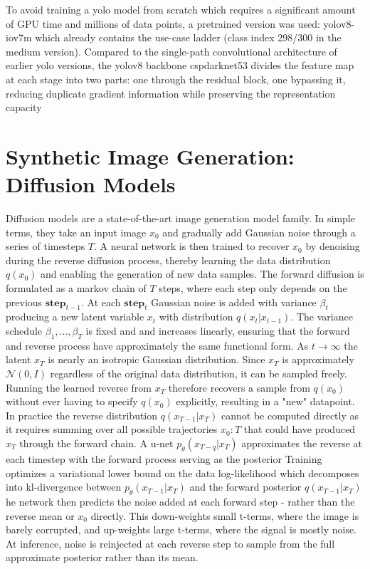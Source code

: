 To avoid training a \gls{yolo} model from scratch which requires a significant amount of GPU time and millions of data points, a pretrained version was used: \gls{yolov8-iov7m} 
which already contains the use-case ladder (class index 298/300 in the medium version).
Compared to the single-path convolutional architecture of earlier \gls{yolo} versions, the \gls{yolo}v8 backbone \gls{cspdarknet53}\cite{cspdarknet} divides the feature map at each stage into two parts: one through the 
residual block, one bypassing it, reducing duplicate gradient information while preserving the representation capacity 

\section{Synthetic Image Generation: Diffusion Models}
Diffusion models are a state-of-the-art image generation model family. In simple terms, they take an input image $x_0$
and gradually add Gaussian noise through a series of timesteps $T$. A neural network is then trained to recover $x_0$
by denoising during the reverse diffusion process, thereby learning the data distribution $q(x_0)$ and enabling the generation of new data samples. 
The forward diffusion is formulated as a \gls{markov chain} of $T$ steps, where each step only depends on the previous $\mathbf{step}_{t-1}$. At each $\mathbf{step}_t$
Gaussian noise is added with variance $\beta_t$ producing a new latent variable $x_t$ with distribution $q(x_t|x_{t-1})$. The variance schedule $\beta_1, ..., \beta_T$ is fixed and and increases linearly, 
ensuring that the forward and reverse process have approximately the same functional form\cite{diffusion}. As $t \rightarrow \infty$ the latent $x_T$ is nearly an \gls{isotropic Gaussian distribution}. Since $x_T$ 
is approximately $\mathcal{N}(0,I)$ regardless of the original data distribution, it can be sampled freely. Running the learned reverse from $x_T$ therefore recovers a sample from $q(x_0)$ without ever having to specify 
$q(x_0)$ explicitly, resulting in a "new" datapoint. In practice the reverse distribution $q(x_{T-1} | x_T)$ cannot be computed directly as it requires summing over all possible trajectories $x_0:T$ that could have produced $x_T$
through the forward chain. A \gls{u-net} $p_\theta(x_{T-q} | x_T)$ approximates the reverse at each timestep with the forward process serving as the posterior \cite{diffusion}
Training optimizes a variational lower bound on the data \gls{log-likelihood} which decomposes into \gls{kl-divergence} between $p_\theta(x_{T-1} | x_T)$  and the forward posterior $q(x_{T-1} | x_T)$ 
he network then predicts the noise added at each forward step - rather than the reverse mean or $x_0$ directly. This down-weights small t-terms, where the image is barely corrupted, and up-weights large t-terms, where the signal is mostly noise.
At inference, noise is reinjected at each reverse step to sample from the full approximate posterior rather than its mean.

